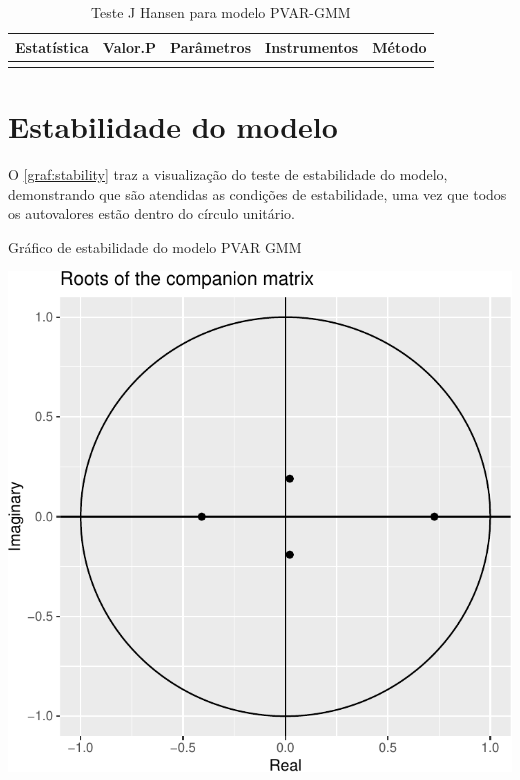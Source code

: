\documentclass[
  12pt,
  12pt,
  openright,
  oneside,
  a4paper,
  chapter=TITLE,
  section=TITLE,
  subsection=TITLE,
  subsubsection=TITLE,
  english,
  portugues,
  sumario=tradicional]{abntex2}
\begin{document}
\begin{table}[!hbtp]
\caption{Teste J Hansen para modelo PVAR-GMM}
\vspace{-1mm}

\begin{tabu} to 
\toprule
Estatística & Valor.P & Parâmetros & Instrumentos & Método\\
\midrule
{} &  &  &  & \\
\bottomrule
\end{tabu}
\vspace{1mm}
\label{tab:hansen}
\vspace{-2mm}
\end{table}

\section{Estabilidade do modelo}

O \autoref{graf:stability} traz a visualização do teste de estabilidade do modelo, demonstrando que são atendidas as condições de estabilidade, uma vez que todos os autovalores estão dentro do círculo unitário.

\begin{grafico}[!hbtp]
\vspace{20pt}
\caption{Gráfico de estabilidade do modelo PVAR GMM}
\vspace{-4mm}

\begin{center}\includegraphics{12-exportedfigures/stability.plot-1} \end{center}
\vspace{-3mm}
\label{graf:stability}
\vspace{-2mm}
\end{grafico}
\end{document}
